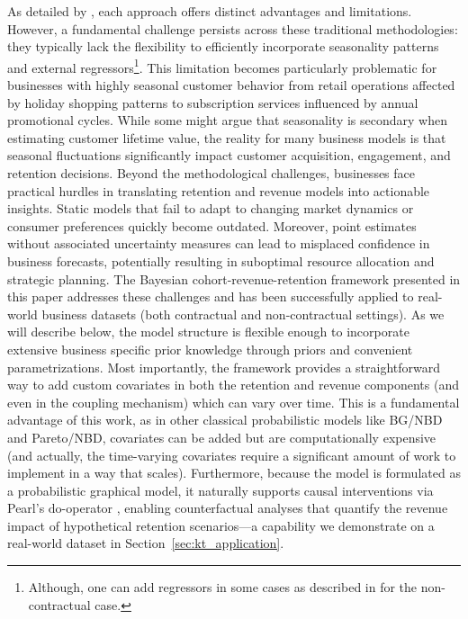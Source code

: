 \documentclass[11pt]{amsart}
\theoremstyle{definition}
\begin{document}
As detailed by \cite{FaderHardieNote2017}, each approach offers distinct advantages and limitations. However, a fundamental
challenge persists across these traditional methodologies: they typically lack the flexibility to efficiently incorporate
seasonality patterns and external regressors\footnote{Although, one can add regressors in some cases as described in
    \cite{FaderHardieNote2007} for the non-contractual case.}. This limitation becomes particularly problematic for businesses
with highly seasonal customer behavior from retail operations affected by holiday shopping patterns to subscription services
influenced by annual promotional cycles. While some might argue that seasonality is secondary when estimating customer
lifetime value, the reality for many business models is that seasonal fluctuations significantly impact customer acquisition,
engagement, and retention decisions. Beyond the methodological challenges, businesses face practical hurdles in translating
retention and revenue models into actionable insights. Static models that fail to adapt to changing market dynamics or
consumer preferences quickly become outdated. Moreover, point estimates without associated uncertainty measures can lead to
misplaced confidence in business forecasts, potentially resulting in suboptimal resource allocation and strategic planning.
The Bayesian cohort-revenue-retention framework presented in this paper addresses these challenges and has been successfully
applied to real-world business datasets (both contractual and non-contractual settings). As we will describe below, the
model structure is flexible enough to incorporate extensive business specific prior knowledge through priors and convenient
parametrizations. Most importantly, the framework provides a straightforward way to add custom covariates in both the retention
and revenue components (and even in the coupling mechanism) which can vary over time. This is a fundamental advantage of this work,
as in other classical probabilistic models like BG/NBD and Pareto/NBD, covariates can be added but are computationally expensive
(and actually, the time-varying covariates require a significant amount of work to implement in a way that scales).
Furthermore, because the model is formulated as a probabilistic graphical model, it naturally supports causal
interventions via Pearl's $\text{do}$-operator \cite{pearl2009causality}, enabling counterfactual analyses that
quantify the revenue impact of hypothetical retention scenarios---a capability we demonstrate on a real-world
dataset in Section~\ref{sec:kt_application}.
\end{document}
